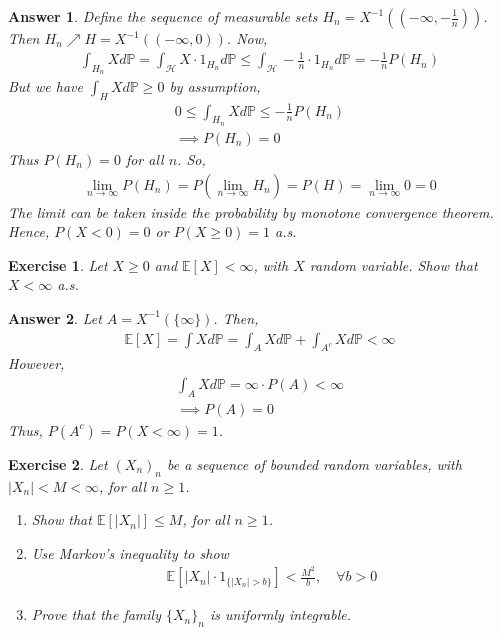 \documentclass[12pt]{article}
\theoremstyle{colon}
\newtheorem{exercise}{Exercise}
\newtheorem*{answer}{Answer}
\begin{document}
\begin{answer}
  Define the sequence of measurable sets $H_n = X^{-1}((-\infty, -\frac{1}{n}))$. Then $H_n \nearrow H = X^{-1}((-\infty, 0))$. Now,
  \begin{gather*}
    \int_{H_n} X d\mathbb{P} = \int_{\mathcal{H}} X \cdot 1_{H_n} d\mathbb{P} \leq \int_{\mathcal{H}} -\frac{1}{n} \cdot 1_{H_n} d\mathbb{P} = -\frac{1}{n} P(H_n)
  \end{gather*}
  But we have $\int_H X d\mathbb{P} \geq 0$ by assumption,
  \begin{gather*}
    0 \leq \int_{H_n} X d\mathbb{P} \leq -\frac{1}{n} P(H_n) \\
    \implies P(H_n) = 0
  \end{gather*}
  Thus $P(H_n) = 0$ for all $n$. So,
  \begin{gather*}
    \lim_{n \rightarrow \infty} P(H_n) = P(\lim_{n \rightarrow \infty} H_n) = P(H) = \lim_{n \rightarrow \infty} 0 = 0
  \end{gather*}
  The limit can be taken inside the probability by monotone convergence theorem. Hence, $P(X < 0) = 0$ or $P(X \geq 0) = 1$ a.s.
\end{answer}

\clearpage

\begin{exercise}
  Let $X \geq 0$ and $\mathbb{E}[X] < \infty$, with $X$ random variable. Show that $X < \infty$ a.s.
\end{exercise}

\begin{answer}
  Let $A = X^{-1}(\{\infty\})$. Then,
  \begin{gather*}
    \mathbb{E}[X] = \int X d \mathbb{P} = \int_A X d \mathbb{P} + \int_{A^c} X d \mathbb{P} < \infty
  \end{gather*}
  However,
  \begin{gather*}
    \int_A X d \mathbb{P} = \infty \cdot P(A) < \infty \\
    \implies P(A) = 0
  \end{gather*}
  Thus, $P(A^c) = P(X < \infty) = 1$.
\end{answer}

\clearpage

\begin{exercise}
  Let $(X_n)_n$ be a sequence of bounded random variables, with $\lvert X_n \rvert < M < \infty$, for all $n \geq 1$.
  \begin{enumerate}[label=\roman*)]
    \item Show that $\mathbb{E}[\lvert X_n \rvert] \leq M$, for all $n \geq 1$.
    \item Use Markov's inequality to show
      \begin{gather*}
        \mathbb{E}[\lvert X_n \rvert \cdot 1_{\{ \lvert X_n \rvert > b \}}] < \frac{M^2}{b}, \quad \forall b > 0
      \end{gather*}
    \item Prove that the family $\{ X_n \}_n$ is uniformly integrable.
  \end{enumerate}
\end{exercise}
\end{document}
